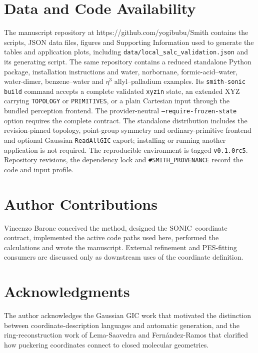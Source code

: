 \documentclass[journal=jctcce,manuscript=article,layout=traditional]{achemso}
\providecommand{\url}[1]{#1}
\newcommand{\SONIC}{SONIC}
\theoremstyle{definition}
\begin{document}
\section*{Data and Code Availability}

The manuscript repository at
\url{https://github.com/yogibubu/Smith} contains the scripts, JSON data files,
figures and Supporting Information used to generate the tables and application
plots, including \texttt{data/local\_salc\_validation.json} and its generating
script.  The same repository contains a reduced standalone Python package,
installation instructions and water, norbornane, formic-acid--water,
water-dimer, benzene--water and $\eta^3$ allyl--palladium examples.  Its
\texttt{smith-sonic build} command accepts a complete validated \texttt{xyzin}
state, an extended XYZ carrying \texttt{TOPOLOGY} or \texttt{PRIMITIVES}, or a
plain Cartesian input through the bundled perception frontend.  The provider-neutral
\texttt{--require-frozen-state} option requires the complete contract.  The
standalone distribution includes the revision-pinned topology, point-group
symmetry and ordinary-primitive frontend and
optional Gaussian \texttt{ReadAllGIC} export; installing or running another
application is not required.  The reproducible environment is tagged
\texttt{v0.1.0rc5}. Repository revisions, the dependency lock and
\texttt{\#SMITH\_PROVENANCE} record the code and input profile.

\section*{Author Contributions}

Vincenzo Barone conceived the method, designed the \SONIC\ coordinate
contract, implemented the active code paths used here, performed the
calculations and wrote the manuscript.  External refinement and PES-fitting
consumers are discussed only as downstream uses of the coordinate definition.

\section*{Acknowledgments}

The author acknowledges the Gaussian GIC work that motivated the distinction
between coordinate-description languages and automatic generation, and the
ring-reconstruction work of Lema-Saavedra and Fern{\'a}ndez-Ramos that clarified
how puckering coordinates connect to closed molecular geometries.


\end{document}
